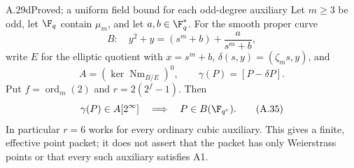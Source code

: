 \begin{claim}{A.29d}{Proved; a uniform field bound for each odd-degree auxiliary}
Let $m\ge3$ be odd, let $\F_q$ contain $\mu_m$, and let
$a,b\in\F_q^*$. For the smooth proper curve
\[
 B:\quad y^2+y=(s^m+b)+\frac{a}{s^m+b},
\]
write $E$ for the elliptic quotient with $x=s^m+b$,
$\delta(s,y)=(\zeta_m s,y)$, and
\[
 A=(\ker\operatorname{Nm}_{B/E})^0,
 \qquad \gamma(P)=[P-\delta P].
\]
Put $f=\operatorname{ord}_m(2)$ and $r=2(2^f-1)$.
Then
\[
 \gamma(P)\in A[2^\infty]
           \quad\Longrightarrow\quad P\in B(\F_{q^r}). 
                                                               \tag{A.35}
\]
In particular $r=6$ works for every ordinary cubic
auxiliary. This gives a finite, effective point packet;
it does not assert that the packet has only Weierstrass
points or that every such auxiliary satisfies A1.
\end{claim}
